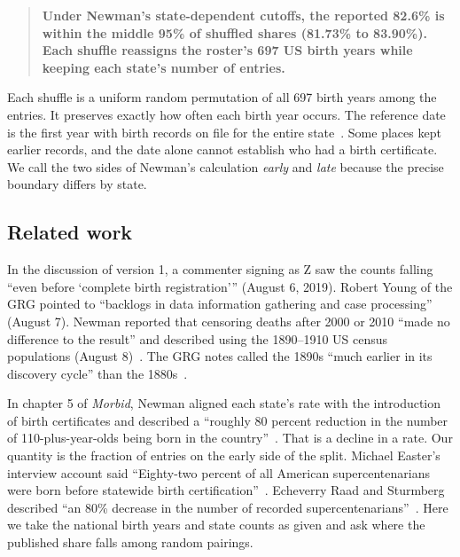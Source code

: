 \documentclass[11pt]{article}
\begin{document}
\begin{quote}
\textbf{Under Newman's state-dependent cutoffs, the reported 82.6\% is within the middle 95\% of shuffled shares (81.73\% to 83.90\%). Each shuffle reassigns the roster's 697 US birth years while keeping each state's number of entries.}
\end{quote}
Each shuffle is a uniform random permutation of all 697 birth years among the entries. It preserves exactly how often each birth year occurs. The reference date is the first year with birth records on file for the entire state~\cite{nchs}. Some places kept earlier records, and the date alone cannot establish who had a birth certificate. We call the two sides of Newman's calculation \emph{early} and \emph{late} because the precise boundary differs by state.

\subsection*{Related work}
In the discussion of version 1, a commenter signing as Z saw the counts falling “even before ‘complete birth registration’” (August 6, 2019). Robert Young of the GRG pointed to “backlogs in data information gathering and case processing” (August 7). Newman reported that censoring deaths after 2000 or 2010 “made no difference to the result” and described using the 1890--1910 US census populations (August 8)~\cite{discussion}. The GRG notes called the 1890s “much earlier in its discovery cycle” than the 1880s~\cite{table-notes}.

In chapter 5 of \emph{Morbid}, Newman aligned each state's rate with the introduction of birth certificates and described a “roughly 80 percent reduction in the number of 110-plus-year-olds being born in the country”~\cite[p.~61]{morbid}. That is a decline in a rate. Our quantity is the fraction of entries on the early side of the split. Michael Easter's interview account said “Eighty-two percent of all American supercentenarians were born before statewide birth certification”~\cite{easter}. Echeverry Raad and Sturmberg described “an 80\% decrease in the number of recorded supercentenarians”~\cite{redzones}. Here we take the national birth years and state counts as given and ask where the published share falls among random pairings.
\end{document}
